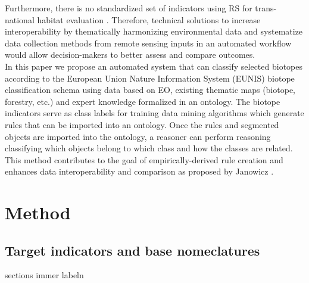 \documentclass[authoryear, review,12pt,number]{elsarticle}
\begin{document}
Furthermore, there is no standardized set of indicators using RS for
trans-national habitat evaluation \citep{Lucas2015}. Therefore, technical
solutions to increase interoperability by thematically harmonizing
environmental data and systematize data collection methods from remote sensing
inputs in an automated workflow would allow decision-makers to better assess and compare outcomes. 
\\
In this paper we propose an automated system that can classify selected
biotopes according to the European Union Nature Information System (EUNIS)
biotope classification schema using data based on EO, existing thematic maps
(biotope, forestry, etc.) and expert knowledge formalized in an ontology.  The
biotope indicators serve as class labels for training data mining algorithms
which generate rules that can be imported into an ontology. Once the rules and
segmented objects are imported into the ontology, a reasoner can perform
reasoning classifying which objects belong to which class and how the classes
are related. This method contributes to the goal of empirically-derived rule
creation and enhances data interoperability and comparison as proposed by
Janowicz \citep{Janowicz2012}.

\section{Method} \subsection{Target indicators
and base nomeclatures} \label{subsec_indicators_and_nomenclatures}%
sections immer labeln
\end{document}
